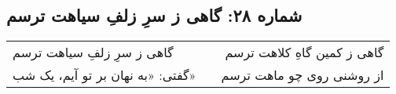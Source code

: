 \begin{center}
\section*{شماره ۲۸: گاهی ز سرِ زلفِ سیاهت ترسم}
\label{sec:028}
\begin{longtable}{l p{0.5cm} r}
گاهی ز سرِ زلفِ سیاهت ترسم
&&
گاهی ز کمین گاهِ کلاهت ترسم
\\
گفتی: «به نهان بر تو آیم، یک شب»
&&
از روشنی روی چو ماهت ترسم
\\
\end{longtable}
\end{center}
